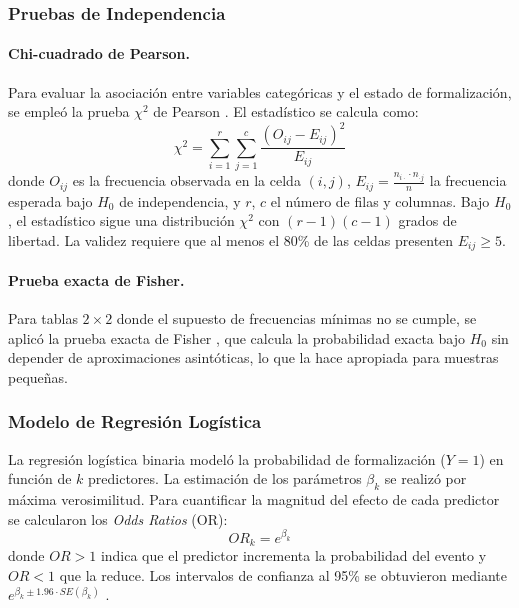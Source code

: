 \documentclass[11pt,a4paper]{article}
\begin{document}
\subsubsection{Pruebas de Independencia}

\paragraph{Chi-cuadrado de Pearson.}
Para evaluar la asociación entre variables categóricas y el estado de formalización, se empleó la prueba $\chi^{2}$ de Pearson \citep{agresti2018}. El estadístico se calcula como:
\begin{equation}
    \chi^{2} = \sum_{i = 1}^{r}{\sum_{j = 1}^{c}\frac{(O_{ij} - E_{ij})^{2}}{E_{ij}}}
\end{equation}
donde $O_{ij}$ es la frecuencia observada en la celda $(i,j)$, $E_{ij} = \frac{n_{i \cdot} \cdot n_{\cdot j}}{n}$ la frecuencia esperada bajo $H_{0}$ de independencia, y $r$, $c$ el número de filas y columnas. Bajo $H_{0}$, el estadístico sigue una distribución $\chi^{2}$ con $(r - 1)(c - 1)$ grados de libertad. La validez requiere que al menos el 80\% de las celdas presenten $E_{ij} \geq 5$.

\paragraph{Prueba exacta de Fisher.}
Para tablas $2 \times 2$ donde el supuesto de frecuencias mínimas no se cumple, se aplicó la prueba exacta de Fisher \citep{agresti2018}, que calcula la probabilidad exacta bajo $H_{0}$ sin depender de aproximaciones asintóticas, lo que la hace apropiada para muestras pequeñas.

\subsubsection{Modelo de Regresi\'on Log\'istica}
La regresión logística binaria \citep{hosmer2013} modeló la probabilidad de formalización ($Y = 1$) en función de $k$ predictores. La estimación de los parámetros $\beta_{k}$ se realizó por máxima verosimilitud. Para cuantificar la magnitud del efecto de cada predictor se calcularon los \textit{Odds Ratios} (OR):
\begin{equation}
    OR_{k} = e^{\beta_{k}}
\end{equation}
donde $OR > 1$ indica que el predictor incrementa la probabilidad del evento y $OR < 1$ que la reduce. Los intervalos de confianza al 95\% se obtuvieron mediante $e^{\beta_{k} \pm 1.96 \cdot SE(\beta_{k})}$ \citep{bruce2022}.
\end{document}
